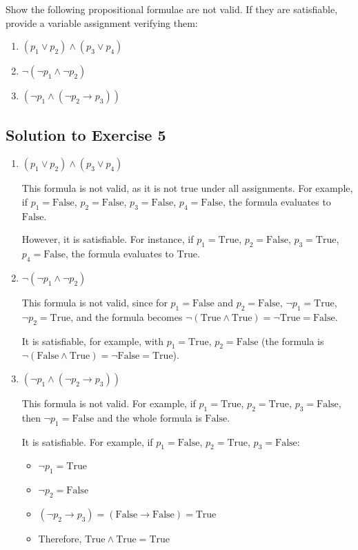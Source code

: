 \documentclass[11pt]{article}
\begin{document}
    Show the following propositional formulae are not valid.
    If they are satisfiable, provide a variable assignment verifying them:

    \begin{enumerate}
        \item $(p_1 \vee p_2) \wedge (p_3 \vee p_4)$
        \item $\neg (\neg p_1 \wedge \neg p_2)$
        \item $(\neg p_1 \wedge (\neg p_2 \rightarrow p_3))$
    \end{enumerate}

    \subsection*{Solution to Exercise 5}

    \begin{enumerate}
        \item \textbf{$(p_1 \vee p_2) \wedge (p_3 \vee p_4)$}

        This formula is not valid, as it is not true under all assignments.
        For example, if $p_1 = \text{False}$, $p_2 = \text{False}$, $p_3 = \text{False}$, $p_4 = \text{False}$, the formula evaluates to $\text{False}$.

        However, it is satisfiable. For instance, if $p_1 = \text{True}$, $p_2 = \text{False}$, $p_3 = \text{True}$, $p_4 = \text{False}$, the formula evaluates to $\text{True}$.

        \item \textbf{$\neg (\neg p_1 \wedge \neg p_2)$}

        This formula is not valid, since for $p_1 = \text{False}$ and $p_2 = \text{False}$, $\neg p_1 = \text{True}$, $\neg p_2 = \text{True}$, and the formula becomes $\neg (\text{True} \wedge \text{True}) = \neg \text{True} = \text{False}$.

        It is satisfiable, for example, with $p_1 = \text{True}$, $p_2 = \text{False}$ (the formula is $\neg (\text{False} \wedge \text{True}) = \neg \text{False} = \text{True}$).

        \item \textbf{$(\neg p_1 \wedge (\neg p_2 \rightarrow p_3))$}

        This formula is not valid. For example, if $p_1 = \text{True}$, $p_2 = \text{True}$, $p_3 = \text{False}$, then $\neg p_1 = \text{False}$ and the whole formula is $\text{False}$.

        It is satisfiable. For example, if $p_1 = \text{False}$, $p_2 = \text{True}$, $p_3 = \text{False}$:
        \begin{itemize}
            \item $\neg p_1 = \text{True}$
            \item $\neg p_2 = \text{False}$
            \item $(\neg p_2 \rightarrow p_3) = (\text{False} \rightarrow \text{False}) = \text{True}$
            \item Therefore, $\text{True} \wedge \text{True} = \text{True}$
        \end{itemize}
    \end{enumerate}
\end{document}
